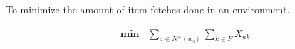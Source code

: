 To minimize the amount of item fetches done in an environment.

\begin{align*}
    \mathbf{min} &\sum_{a\in N^+(u_0)} \sum_{k \in F} {X_{ak}}
\end{align*}